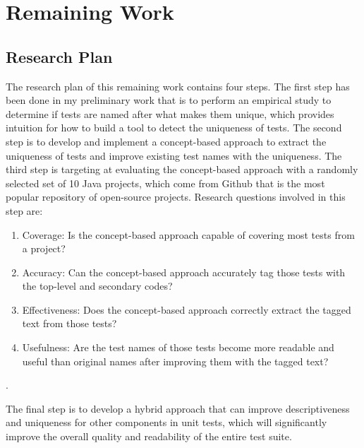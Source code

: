 \documentclass[proposal.tex]{subfiles}
\begin{document}
\section{Remaining Work}
\label{sec:remaining-work}

\subsection{Research Plan}

The research plan of this remaining work contains four steps.
%
The first step has been done in my preliminary work that is to perform an empirical study to determine if tests are named after what makes them unique, which provides intuition for how to build a tool to detect the uniqueness of tests.
%
The second step is to develop and implement a concept-based approach to extract the uniqueness of tests and improve existing test names with the uniqueness.
%
The third step is targeting at evaluating the concept-based approach with a randomly selected set of \num{10} Java projects, which come from Github that is the most popular repository of open-source projects.
%
Research questions involved in this step are:
\begin{enumerate}
    \item Coverage: Is the concept-based approach capable of covering most tests from a project?
    \item Accuracy: Can the concept-based approach accurately tag those tests with the top-level and secondary codes?
    \item Effectiveness: Does the concept-based approach correctly extract the tagged text from those tests?
    \item Usefulness: Are the test names of those tests become more readable and useful than original names after improving them with the tagged text?
\end{enumerate}.

The final step is to develop a hybrid approach that can improve descriptiveness and uniqueness for other components in unit tests, which will significantly improve the overall quality and readability of the entire test suite.
\end{document}

